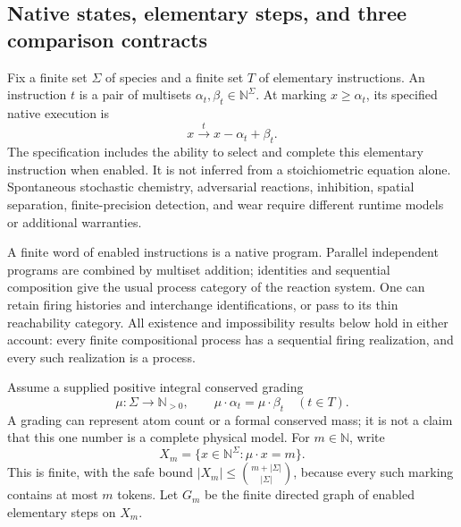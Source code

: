 \documentclass[11pt]{article}
\theoremstyle{definition}
\theoremstyle{remark}
\begin{document}
\subsection{Native states, elementary steps, and three comparison contracts}
Fix a finite set $\Sigma$ of species and a finite set $T$ of elementary instructions. An instruction $t$ is a pair of multisets $\alpha_t,\beta_t\in\mathbb N^{\Sigma}$. At marking $x\geq\alpha_t$, its specified native execution is
\[
 x\xrightarrow{t}x-\alpha_t+\beta_t.
\]
The specification includes the ability to select and complete this elementary instruction when enabled. It is not inferred from a stoichiometric equation alone. Spontaneous stochastic chemistry, adversarial reactions, inhibition, spatial separation, finite-precision detection, and wear require different runtime models or additional warranties.

A finite word of enabled instructions is a native program. Parallel independent programs are combined by multiset addition; identities and sequential composition give the usual process category of the reaction system. One can retain firing histories and interchange identifications, or pass to its thin reachability category. All existence and impossibility results below hold in either account: every finite compositional process has a sequential firing realization, and every such realization is a process.

Assume a supplied positive integral conserved grading
\begin{equation}\label{er:eq:mass}
 \mu:\Sigma\longrightarrow\mathbb N_{>0},\qquad
 \mu\mathbin\cdot\alpha_t=\mu\mathbin\cdot\beta_t\quad(t\in T).
\end{equation}
A grading can represent atom count or a formal conserved mass; it is not a claim that this one number is a complete physical model. For $m\in\mathbb N$, write
\[
 X_m=\{x\in\mathbb N^{\Sigma}:\mu\mathbin\cdot x=m\}.
\]
This is finite, with the safe bound $|X_m|\leq {m+|\Sigma|\choose |\Sigma|}$, because every such marking contains at most $m$ tokens. Let $G_m$ be the finite directed graph of enabled elementary steps on $X_m$.
\end{document}
